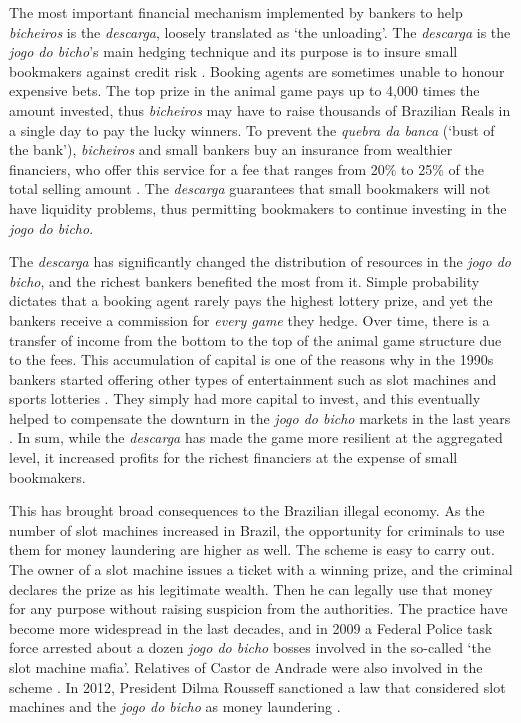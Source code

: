 \documentclass[a4paper,12pt]{article}
\begin{document}
The most important financial mechanism implemented by bankers to help \textit{bicheiros} is the \textit{descarga}, loosely translated as `the unloading'. The \textit{descarga} is the \textit{jogo do bicho}'s main hedging technique and its purpose is to insure small bookmakers against credit risk \citetext{\citealp[59]{labronici2012paratodos}; \citealp[178]{magalhaes2005ganhou}}. Booking agents are sometimes unable to honour expensive bets. The top prize in the animal game pays up to 4,000 times the amount invested, thus \textit{bicheiros} may have to raise thousands of Brazilian Reals in a single day to pay the lucky winners. To prevent the \textit{quebra da banca} (`bust of the bank'), \textit{bicheiros} and small bankers buy an insurance from wealthier financiers, who offer this service for a fee that ranges from 20\% to 25\% of the total selling amount \citep{fsp2006descarga}. The \textit{descarga} guarantees that small bookmakers will not have liquidity problems, thus permitting bookmakers to continue investing in the \textit{jogo do bicho}.

The \textit{descarga} has significantly changed the distribution of resources in the \textit{jogo do bicho}, and the richest bankers benefited the most from it. Simple probability dictates that a booking agent rarely pays the highest lottery prize, and yet the bankers receive a commission for \textit{every game} they hedge. Over time, there is a transfer of income from the bottom to the top of the animal game structure due to the fees. This accumulation of capital is one of the reasons why in the 1990s bankers started offering other types of entertainment such as slot machines and sports lotteries \citep{estado2006cacaniquel,globo2015cacaniquel,terra2011cacaniquel}. They simply had more capital to invest, and this eventually helped to compensate the downturn in the \textit{jogo do bicho} markets in the last years \citep{globo2017castor}. In sum, while the \textit{descarga} has made the game more resilient at the aggregated level, it increased profits for the richest financiers at the expense of small bookmakers.

This has brought broad consequences to the Brazilian illegal economy. As the number of slot machines increased in Brazil, the opportunity for criminals to use them for money laundering are higher as well. The scheme is easy to carry out. The owner of a slot machine issues a ticket with a winning prize, and the criminal declares the prize as his legitimate wealth. Then he can legally use that money for any purpose without raising suspicion from the authorities. The practice have become more widespread in the last decades, and in 2009 a Federal Police task force arrested about a dozen \textit{jogo do bicho} bosses involved in the so-called `the slot machine mafia'. Relatives of Castor de Andrade were also involved in the scheme \citep{estado2011cacaniquel}. In 2012, President Dilma Rousseff sanctioned a law that considered slot machines and the \textit{jogo do bicho} as money laundering \citep{agenciabrasil2012dilma}. 
\end{document}
